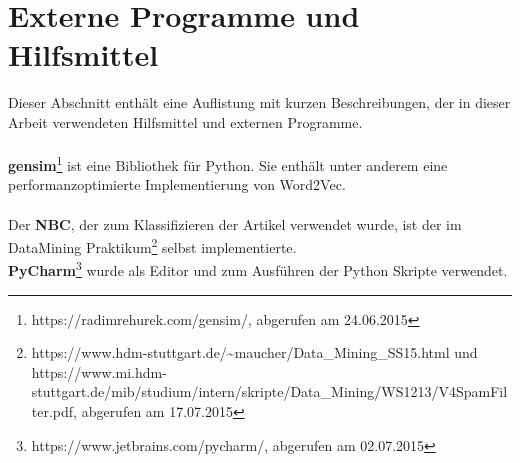 \documentclass[12pt,a4paper]{report}
\begin{document}
	\section{Externe Programme und Hilfsmittel}
	Dieser Abschnitt enthält eine Auflistung mit kurzen Beschreibungen, der in dieser Arbeit verwendeten Hilfsmittel und externen Programme.\\
	\vspace{1em}\\	
	\textbf{gensim}\cite{rehurek_lrec}\footnote{https://radimrehurek.com/gensim/, abgerufen am 24.06.2015} ist eine Bibliothek für Python. Sie enthält unter anderem eine performanzoptimierte Implementierung von Word2Vec.\\ 
	\vspace{1em}\\
	Der \textbf{NBC}, der zum Klassifizieren der Artikel verwendet wurde, ist der im DataMining Praktikum\footnote{https://www.hdm-stuttgart.de/\textasciitilde maucher/Data\_Mining\_SS15.html und https://www.mi.hdm-stuttgart.de/mib/studium/intern/skripte/Data\_Mining/WS1213/V4SpamFilter.pdf, abgerufen am 17.07.2015} selbst implementierte.
	\vspace{1em}\\
	\textbf{PyCharm}\footnote{https://www.jetbrains.com/pycharm/, abgerufen am 02.07.2015} wurde als Editor und zum Ausführen der Python Skripte verwendet.
	
\end{document}
